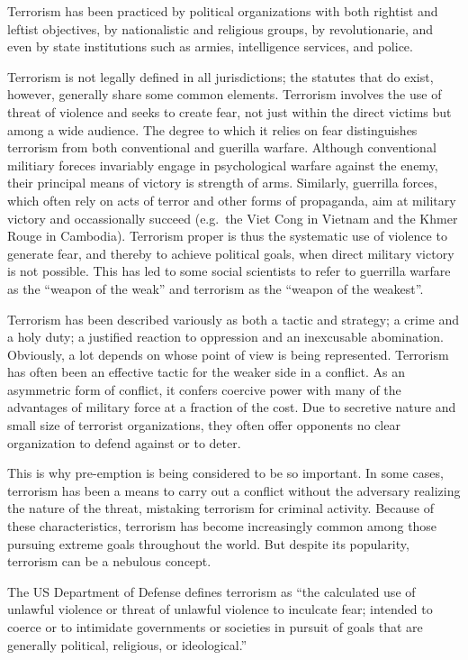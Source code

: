\documentclass[
  openany]{book}
\begin{document}
Terrorism has been practiced by political organizations with both rightist and leftist objectives, by nationalistic and religious groups, by revolutionarie, and even by state institutions such as armies, intelligence services, and police.

Terrorism is not legally defined in all jurisdictions; the statutes that do exist, however, generally share some common elements. Terrorism involves the use of threat of violence and seeks to create fear, not just within the direct victims but among a wide audience. The degree to which it relies on fear distinguishes terrorism from both conventional and guerilla warfare. Although conventional militiary foreces invariably engage in psychological warfare against the enemy, their principal means of victory is strength of arms. Similarly, guerrilla forces, which often rely on acts of terror and other forms of propaganda, aim at military victory and occassionally succeed (e.g.~the Viet Cong in Vietnam and the Khmer Rouge in Cambodia). Terrorism proper is thus the systematic use of violence to generate fear, and thereby to achieve political goals, when direct military victory is not possible. This has led to some social scientists to refer to guerrilla warfare as the ``weapon of the weak'' and terrorism as the ``weapon of the weakest''.

Terrorism has been described variously as both a tactic and strategy; a crime and a holy duty; a justified reaction to oppression and an inexcusable abomination. Obviously, a lot depends on whose point of view is being represented. Terrorism has often been an effective tactic for the weaker side in a conflict. As an asymmetric form of conflict, it confers coercive power with many of the advantages of military force at a fraction of the cost. Due to secretive nature and small size of terrorist organizations, they often offer opponents no clear organization to defend against or to deter.

This is why pre-emption is being considered to be so important. In some cases, terrorism has been a means to carry out a conflict without the adversary realizing the nature of the threat, mistaking terrorism for criminal activity. Because of these characteristics, terrorism has become increasingly common among those pursuing extreme goals throughout the world. But despite its popularity, terrorism can be a nebulous concept.

The US Department of Defense defines terrorism as ``the calculated use of unlawful violence or threat of unlawful violence to inculcate fear; intended to coerce or to intimidate governments or societies in pursuit of goals that are generally political, religious, or ideological.''
\end{document}
